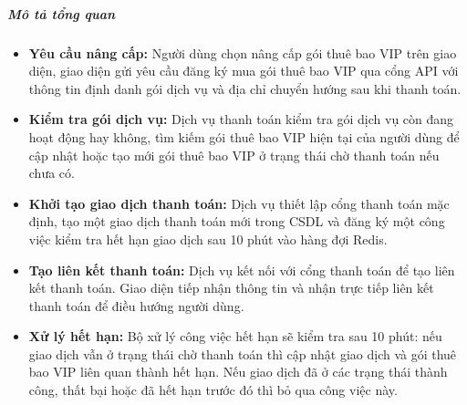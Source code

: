 \subparagraph{Mô tả tổng quan}

\begin{itemize}

\item \textbf{Yêu cầu nâng cấp:}
Người dùng chọn nâng cấp gói thuê bao VIP trên giao diện,
giao diện gửi yêu cầu đăng ký mua gói thuê bao VIP
qua cổng API với thông tin định danh gói dịch vụ
và địa chỉ chuyển hướng sau khi thanh toán.

\item \textbf{Kiểm tra gói dịch vụ:}
Dịch vụ thanh toán
kiểm tra gói dịch vụ còn đang hoạt động hay không,
tìm kiếm gói thuê bao VIP hiện tại của người dùng
để cập nhật hoặc tạo mới gói thuê bao VIP
ở trạng thái chờ thanh toán nếu chưa có.

\item \textbf{Khởi tạo giao dịch thanh toán:}
Dịch vụ thiết lập cổng thanh toán mặc định,
tạo một giao dịch thanh toán mới trong CSDL
và đăng ký một công việc kiểm tra hết hạn giao dịch sau 10 phút
vào hàng đợi Redis.

\item \textbf{Tạo liên kết thanh toán:}
Dịch vụ kết nối
với cổng thanh toán để tạo liên kết thanh toán.
Giao diện tiếp nhận thông tin
và nhận trực tiếp liên kết thanh toán
để điều hướng người dùng.

\item \textbf{Xử lý hết hạn:}
Bộ xử lý công việc hết hạn sẽ kiểm tra sau 10 phút:
nếu giao dịch vẫn ở trạng thái chờ thanh toán
thì cập nhật giao dịch và gói thuê bao VIP liên quan thành hết hạn.
Nếu giao dịch đã ở các trạng thái thành công, thất bại hoặc đã hết hạn trước đó thì bỏ qua công việc này.
\end{itemize}
